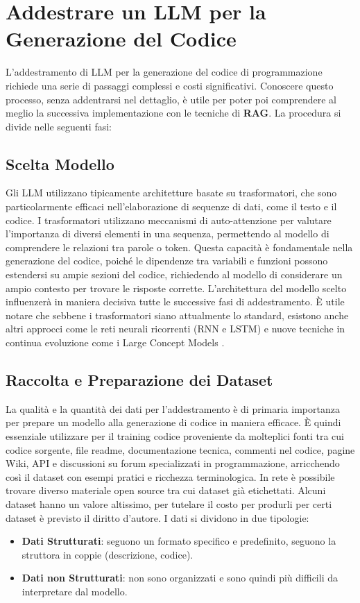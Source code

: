 \documentclass[12pt,a4paper,openright,twoside]{book}
\begin{document}
\chapter{Addestrare un LLM per la Generazione del Codice}

L'addestramento di LLM per la generazione del codice di programmazione richiede una serie di passaggi complessi e costi significativi.
Conoscere questo processo, senza addentrarsi nel dettaglio, è utile per poter poi comprendere al meglio la successiva implementazione con le tecniche di \textbf{RAG}.
La procedura si divide nelle seguenti fasi:
\section{Scelta Modello}
Gli LLM utilizzano tipicamente architetture basate su trasformatori, che sono particolarmente efficaci nell'elaborazione di sequenze di dati, come il testo e il codice.
I trasformatori utilizzano meccanismi di auto-attenzione per valutare l'importanza di diversi elementi in una sequenza,
permettendo al modello di comprendere le relazioni tra parole o token.
Questa capacità è fondamentale nella generazione del codice, poiché le dipendenze tra variabili e funzioni possono estendersi su ampie sezioni del codice, richiedendo al modello di considerare un ampio contesto per trovare le risposte corrette.
L'architettura del modello scelto influenzerà in maniera decisiva tutte le successive fasi di addestramento.
È utile notare che sebbene i trasformatori siano attualmente lo standard, esistono anche altri approcci come le reti neurali ricorrenti (RNN e LSTM) e nuove tecniche in continua evoluzione come i Large Concept Models \cite{code-llm-survey-2024}.
\section{Raccolta e Preparazione dei Dataset}
La qualità e la quantità dei dati per l'addestramento è di primaria importanza per prepare un modello alla generazione di codice in maniera efficace.
È quindi essenziale utilizzare per il training codice proveniente da molteplici fonti tra cui codice sorgente, file readme, documentazione tecnica, commenti nel codice,
pagine Wiki, API e discussioni su forum specializzati in programmazione, arricchendo così il dataset con esempi pratici e ricchezza terminologica.
In rete è possibile trovare diverso materiale open source tra cui dataset già etichettati. Alcuni dataset hanno un valore altissimo,
per tutelare il costo per produrli per certi dataset è previsto il diritto d'autore.
I dati si dividono in due tipologie:
\begin{itemize}
    \item \textbf{Dati Strutturati}: seguono un formato specifico e predefinito, seguono la struttora in coppie (descrizione, codice).
    \item \textbf{Dati non Strutturati}: non sono organizzati e sono quindi più difficili da interpretare dal modello. 
\end{itemize}
\end{document}
